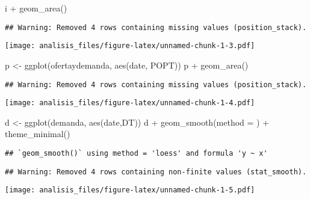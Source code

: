 \documentclass[
]{article}
\newenvironment{Shaded}{\begin{snugshade}}{\end{snugshade}}
\newcommand{\AttributeTok}[1]{\textcolor[rgb]{0.77,0.63,0.00}{#1}}
\newcommand{\FunctionTok}[1]{\textcolor[rgb]{0.00,0.00,0.00}{#1}}
\newcommand{\NormalTok}[1]{#1}
\newcommand{\OtherTok}[1]{\textcolor[rgb]{0.56,0.35,0.01}{#1}}
\newcommand{\SpecialCharTok}[1]{\textcolor[rgb]{0.00,0.00,0.00}{#1}}
\begin{document}
\begin{Shaded}
\begin{Highlighting}[]
\NormalTok{i }\SpecialCharTok{+} \FunctionTok{geom\_area}\NormalTok{()}
\end{Highlighting}
\end{Shaded}

\begin{verbatim}
## Warning: Removed 4 rows containing missing values (position_stack).
\end{verbatim}

\texttt{[image: analisis\_files/figure-latex/unnamed-chunk-1-3.pdf]}

\begin{Shaded}
\begin{Highlighting}[]
\NormalTok{p }\OtherTok{\textless{}{-}} \FunctionTok{ggplot}\NormalTok{(ofertaydemanda, }\FunctionTok{aes}\NormalTok{(date, POPT))}
\NormalTok{p }\SpecialCharTok{+} \FunctionTok{geom\_area}\NormalTok{()}
\end{Highlighting}
\end{Shaded}

\begin{verbatim}
## Warning: Removed 4 rows containing missing values (position_stack).
\end{verbatim}

\texttt{[image: analisis\_files/figure-latex/unnamed-chunk-1-4.pdf]}

\begin{Shaded}
\begin{Highlighting}[]
\NormalTok{d }\OtherTok{\textless{}{-}} \FunctionTok{ggplot}\NormalTok{(demanda, }\FunctionTok{aes}\NormalTok{(date,DT))}
\NormalTok{d }\SpecialCharTok{+} \FunctionTok{geom\_smooth}\NormalTok{(}\AttributeTok{method =}\NormalTok{ ) }\SpecialCharTok{+}
  \FunctionTok{theme\_minimal}\NormalTok{()}
\end{Highlighting}
\end{Shaded}

\begin{verbatim}
## `geom_smooth()` using method = 'loess' and formula 'y ~ x'
\end{verbatim}

\begin{verbatim}
## Warning: Removed 4 rows containing non-finite values (stat_smooth).
\end{verbatim}

\texttt{[image: analisis\_files/figure-latex/unnamed-chunk-1-5.pdf]}
\end{document}
